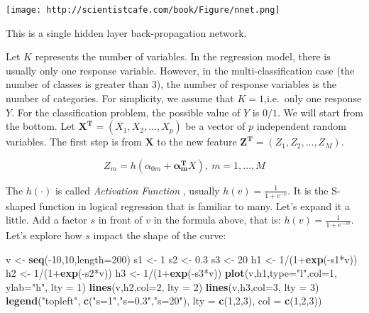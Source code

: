\documentclass[]{book}
\newenvironment{Shaded}{\begin{snugshade}}{\end{snugshade}}
\newcommand{\KeywordTok}[1]{\textcolor[rgb]{0.13,0.29,0.53}{\textbf{{#1}}}}
\newcommand{\DataTypeTok}[1]{\textcolor[rgb]{0.13,0.29,0.53}{{#1}}}
\newcommand{\DecValTok}[1]{\textcolor[rgb]{0.00,0.00,0.81}{{#1}}}
\newcommand{\FloatTok}[1]{\textcolor[rgb]{0.00,0.00,0.81}{{#1}}}
\newcommand{\StringTok}[1]{\textcolor[rgb]{0.31,0.60,0.02}{{#1}}}
\newcommand{\NormalTok}[1]{{#1}}
\theoremstyle{definition}
\theoremstyle{definition}
\theoremstyle{remark}
\begin{document}
\texttt{[image: http://scientistcafe.com/book/Figure/nnet.png]}

This is a single hidden layer back-propagation network.

Let \(K\) represents the number of variables. In the regression model,
there is usually only one response variable. However, in the
multi-classification case (the number of classes is greater than 3), the
number of response variables is the number of categories. For
simplicity, we assume that \(K = 1\),i.e.~only one response \(Y\). For
the classification problem, the possible value of \(Y\) is \(0/1\). We
will start from the bottom. Let
\(\mathbf{X^{T}}=(X_{1},X_{2},\dots,X_{p})\) be a vector of \(p\)
independent random variables. The first step is from \(\mathbf{X}\) to
the new feature \(\mathbf{Z^{T}}=(Z_1,Z_2,\dots, Z_M)\).

\[Z_{m}=h(\alpha_{0m}+\mathbf{\alpha_{m}^{T}}X),\ m=1,\dots,M\]

The \(h(\cdot)\) is called \emph{Activation Function} , usually
\(h(v)=\frac{1}{1+e^{-v}}\). It is the S-shaped function in logical
regression that is familiar to many. Let's expand it a little. Add a
factor \(s\) in front of \(v\) in the formula above, that is:
\(h(v)=\frac{1}{1+e^{-sv}}\). Let's explore how \(s\) impact the shape
of the curve:

\begin{Shaded}
\begin{Highlighting}[]
\NormalTok{v <-}\StringTok{ }\KeywordTok{seq}\NormalTok{(-}\DecValTok{10}\NormalTok{,}\DecValTok{10}\NormalTok{,}\DataTypeTok{length=}\DecValTok{200}\NormalTok{)}
\NormalTok{s1 <-}\StringTok{ }\DecValTok{1}
\NormalTok{s2 <-}\StringTok{ }\FloatTok{0.3}
\NormalTok{s3 <-}\StringTok{ }\DecValTok{20}
\NormalTok{h1 <-}\StringTok{ }\DecValTok{1}\NormalTok{/(}\DecValTok{1}\NormalTok{+}\KeywordTok{exp}\NormalTok{(-s1*v))}
\NormalTok{h2 <-}\StringTok{ }\DecValTok{1}\NormalTok{/(}\DecValTok{1}\NormalTok{+}\KeywordTok{exp}\NormalTok{(-s2*v))}
\NormalTok{h3 <-}\StringTok{ }\DecValTok{1}\NormalTok{/(}\DecValTok{1}\NormalTok{+}\KeywordTok{exp}\NormalTok{(-s3*v))}
\KeywordTok{plot}\NormalTok{(v,h1,}\DataTypeTok{type=}\StringTok{"l"}\NormalTok{,}\DataTypeTok{col=}\DecValTok{1}\NormalTok{, }\DataTypeTok{ylab=}\StringTok{"h"}\NormalTok{, }\DataTypeTok{lty =} \DecValTok{1}\NormalTok{)}
\KeywordTok{lines}\NormalTok{(v,h2,}\DataTypeTok{col=}\DecValTok{2}\NormalTok{, }\DataTypeTok{lty =} \DecValTok{2}\NormalTok{)}
\KeywordTok{lines}\NormalTok{(v,h3,}\DataTypeTok{col=}\DecValTok{3}\NormalTok{, }\DataTypeTok{lty =} \DecValTok{3}\NormalTok{)}
\KeywordTok{legend}\NormalTok{(}\StringTok{"topleft"}\NormalTok{, }\KeywordTok{c}\NormalTok{(}\StringTok{"s=1"}\NormalTok{,}\StringTok{"s=0.3"}\NormalTok{,}\StringTok{"s=20"}\NormalTok{), }\DataTypeTok{lty =} \KeywordTok{c}\NormalTok{(}\DecValTok{1}\NormalTok{,}\DecValTok{2}\NormalTok{,}\DecValTok{3}\NormalTok{), }\DataTypeTok{col =} \KeywordTok{c}\NormalTok{(}\DecValTok{1}\NormalTok{,}\DecValTok{2}\NormalTok{,}\DecValTok{3}\NormalTok{))}
\end{Highlighting}
\end{Shaded}
\end{document}
